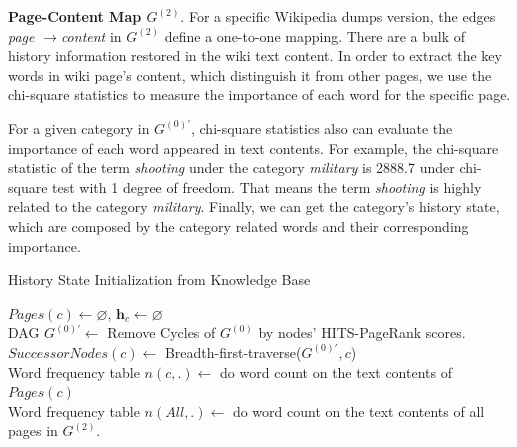 \documentclass[runningheads,a4paper]{llncs}
\begin{document}
\textbf{Page-Content Map \(G^{(2)}\)}. 
For a specific Wikipedia dumps version, the edges  \textit{page} \(\rightarrow\)\textit{content} in \(G^{(2)}\) define a one-to-one mapping.
There are a bulk of history information restored in the wiki text content.
In order to extract the key words in wiki page's content, which distinguish it from other pages, we use the chi-square statistics\cite{yang1997comparative}\cite{liu2009imbalanced} to measure the importance of each word for the specific page.

For a given category in \(G^{(0)'}\), chi-square statistics also can evaluate the importance of each word appeared in text contents. 
For example, the chi-square statistic of the term \textit{shooting} under the category \textit{military} is 2888.7 under chi-square test with 1 degree of freedom.
That means the term \textit{shooting} is highly related to the category \textit{military}.  
Finally, we can get the category's history state, which are  composed by the category related words and their corresponding importance.
\begin{algorithm}[h]
\scriptsize
\caption{History State Initialization from Knowledge Base}
\label{alg:normalStatesInit}

\(Pages(c)\leftarrow \varnothing\), \(\bm{h}_c \leftarrow \varnothing\)\\
DAG \(G^{(0)'} \leftarrow\) Remove Cycles of \(G^{(0)}\) by nodes' HITS-PageRank scores. \label{alg:line2inNormalStatesInit}\\
\(SuccessorNodes(c) \leftarrow \) Breadth-first-traverse(\(G^{(0)'},c\))\label{alg:line3inNormalStatesInit}\\
Word frequency table \(n(c,.) \leftarrow \) do word count on the text contents of \(Pages(c)\) \\
Word frequency table \(n(All,.) \leftarrow \) do word count on the text contents of all pages in \(G^{(2)}\).\\
\end{algorithm}
\end{document}
